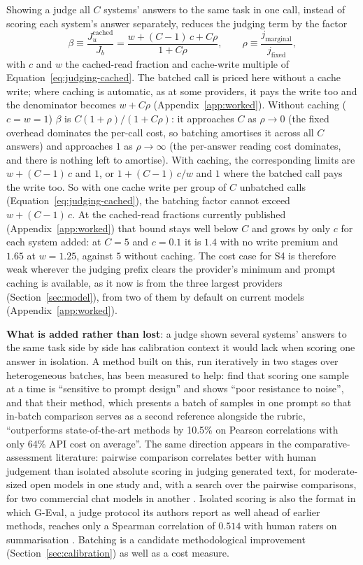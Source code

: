 \documentclass[11pt]{article}
\begin{document}
Showing a judge all $C$ systems' answers to the same task in one call, instead of scoring each system's answer separately, reduces the judging term by the factor
\begin{equation}
\beta \equiv \frac{J_u^{\text{cached}}}{J_b} = \frac{w + (C-1)\,c + C\rho}{1 + C\rho},
\qquad \rho \equiv \frac{j_{\text{marginal}}}{j_{\text{fixed}}},
\label{eq:s4}
\end{equation}
with $c$ and $w$ the cached-read fraction and cache-write multiple of
Equation~\ref{eq:judging-cached}. The batched call is priced here without a cache write; where caching is automatic, as at some providers, it pays the write too and the denominator becomes $w + C\rho$ (Appendix~\ref{app:worked}). Without caching ($c = w = 1$) $\beta$ is
$C(1+\rho)/(1+C\rho)$: it approaches $C$ as $\rho \to 0$ (the fixed overhead dominates the
per-call cost, so batching amortises it across all $C$ answers) and approaches $1$ as
$\rho \to \infty$ (the per-answer reading cost dominates, and there is nothing left to
amortise). With caching, the corresponding limits are $w + (C-1)\,c$ and $1$, or $1 + (C-1)\,c/w$ and $1$ where the batched call pays the write too. So with one cache write per group of $C$ unbatched calls (Equation~\ref{eq:judging-cached}), the batching factor cannot exceed $w + (C-1)\,c$. At the
cached-read fractions currently published (Appendix~\ref{app:worked}) that bound stays well below $C$ and grows by only $c$ for each system added: at $C = 5$ and $c = 0.1$ it is $1.4$ with no write premium and $1.65$ at $w = 1.25$, against $5$ without caching. The cost case for S4 is therefore weak wherever the judging prefix clears the provider's minimum and
prompt caching is available, as it now is from the three largest
providers (Section~\ref{sec:model}), from two of them by default on current models (Appendix~\ref{app:worked}).

\textbf{What is added rather than lost}: a judge shown several systems' answers to the same task side by side has
calibration context it would lack when scoring one answer in isolation. A method built on this, run iteratively in two stages over heterogeneous batches, has been measured to help: \citet{yuan2024batcheval} find that scoring one sample at a
time is ``sensitive to prompt design'' and shows ``poor resistance to noise'', and that
their method, which presents a batch of samples in one prompt so that in-batch comparison serves as a
second reference alongside the rubric, ``outperforms state-of-the-art methods by 10.5\% on
Pearson correlations with only 64\% API cost on average''. The same direction appears in
the comparative-assessment literature: pairwise comparison correlates better with human
judgement than isolated absolute scoring in judging generated text, for moderate-sized open models in one study \citep{liusie2024comparative} and, with a search over the pairwise comparisons, for two commercial chat models in another \citep{liu2024pairs}.
Isolated scoring is also the format in which G-Eval, a judge protocol its authors report as well ahead of earlier methods, reaches
only a Spearman correlation of $0.514$ with human raters on summarisation
\citep{liu2023geval}. Batching is a candidate methodological improvement (Section~\ref{sec:calibration}) as well as a cost measure.
\end{document}
